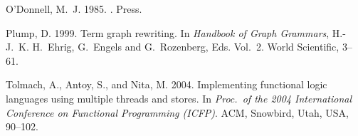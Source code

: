 \documentclass{mytlp}
\begin{document}
\begin{thebibliography}{}
{\sc O'Donnell, M.~J.} 1985.
.
 Press.

{\sc Plump, D.} 1999.
\newblock Term graph rewriting.
\newblock In {\em Handbook of Graph Grammars}, {H.-J.~K. H.~Ehrig, G.~Engels}
  {and} {G.~Rozenberg}, Eds. Vol.~2. World Scientific, 3--61.

{\sc Tolmach, A.}, {\sc Antoy, S.}, {\sc and} {\sc Nita, M.} 2004.
\newblock Implementing functional logic languages using multiple threads and
  stores.
\newblock In {\em Proc.\ of the 2004 International Conference on Functional
  Programming (ICFP)}. ACM, Snowbird, Utah, USA, 90--102.

\end{thebibliography}
\end{document}
